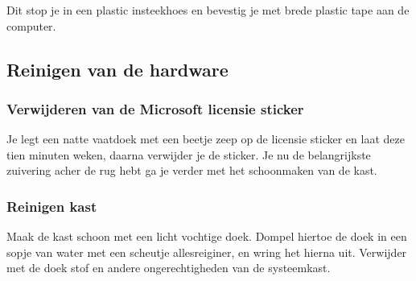 Dit stop je in een plastic insteekhoes en bevestig je met brede plastic tape aan de computer.
\subsection{Reinigen van de hardware}
\subsubsection{Verwijderen van de Microsoft licensie sticker}
Je legt een natte vaatdoek met een beetje zeep op de licensie sticker en laat deze tien minuten weken, daarna verwijder je de sticker. Je nu de belangrijkste zuivering acher de rug hebt ga je verder met het schoonmaken van de kast.
\subsubsection{Reinigen kast}
Maak de kast schoon met een licht vochtige doek. Dompel hiertoe de doek in een sopje van water met een scheutje allesreiginer, en wring het hierna uit. Verwijder met de doek stof en andere ongerechtigheden van de systeemkast.
